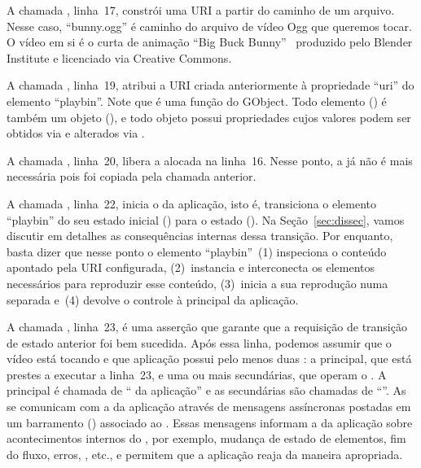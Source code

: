 \documentclass{SBCbookchapter}
\begin{document}
A chamada , linha~17, constrói uma URI a partir do
caminho de um arquivo.  Nesse caso, ``bunny.ogg'' é caminho do arquivo de
vídeo Ogg que queremos tocar.  O vídeo em si é o curta de animação ``Big
Buck Bunny''~\cite{bunny} produzido pelo Blender Institute e licenciado via
Creative Commons.

A chamada , linha~19, atribui a URI criada anteriormente à
propriedade ``uri'' do elemento ``playbin''.  Note que  é
uma função do GObject.  Todo elemento () é também um objeto
(), e todo objeto possui propriedades cujos valores podem ser
obtidos via  e alterados via .

A chamada , linha~20, libera a  alocada na linha~16.
Nesse ponto, a  já não é mais necessária pois foi copiada pela
chamada  anterior.

A chamada , linha~22, inicia o  da
aplicação, isto é, transiciona o elemento ``playbin'' do seu estado inicial
 () para o estado 
().  Na Seção~\ref{sec:dissec}, vamos discutir em
detalhes as consequências internas dessa transição.  Por enquanto, basta
dizer que nesse ponto o elemento ``playbin''~(1) inspeciona o conteúdo
apontado pela URI configurada, (2)~instancia e interconecta os elementos
necessários para reproduzir esse conteúdo, (3)~inicia a sua reprodução numa
 separada e~(4) devolve o controle à  principal da
aplicação.

A chamada , linha~23, é uma asserção que garante que a
requisição de transição de estado anterior foi bem sucedida.  Após essa
linha, podemos assumir que o vídeo está tocando e que aplicação possui pelo
menos duas : a  principal, que está prestes a
executar a linha~23, e uma ou mais  secundárias, que operam o
.  A  principal é chamada de `` da
aplicação'' e as  secundárias são chamadas de ``''.  As  se comunicam com a  da
aplicação através de mensagens assíncronas postadas em um barramento
() associado ao .  Essas mensagens informam a
 da aplicação sobre acontecimentos internos do , por
exemplo, mudança de estado de elementos, fim do fluxo, erros, ,
etc., e permitem que a aplicação reaja da maneira apropriada.
\end{document}
